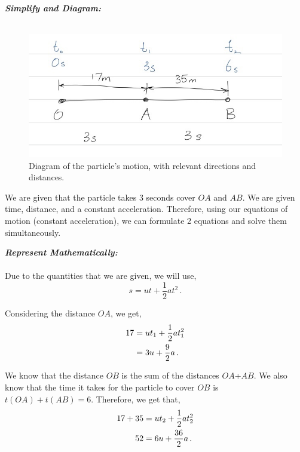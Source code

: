 \begin{subquestions}
\begin{subsubquestions}
\textbf{\textit{Simplify and Diagram:}} \\ \\
\begin{figure}[H]
	\begin{center}
		\includegraphics[scale=0.5]{../2010/figures/2010q5}
		\caption{\label{2010:q5:Move2} Diagram of the particle's motion, with relevant directions and distances.}
	\end{center}
\end{figure}
We are given that the particle takes 3 seconds cover $OA$ and $AB$. We are given time, distance, and a constant acceleration. Therefore, using our equations of motion (constant acceleration), we can formulate 2 equations and solve them simultaneously.




\textbf{\textit{Represent Mathematically:}} \\ \\
Due to the quantities that we are given, we will use,
\begin{equation}
	s = ut + \frac{1}{2}at^2 \,.
\end{equation}

Considering the distance $OA$, we get,
\begin{align}
	17 & = ut_1 + \frac{1}{2}at_1^2 \nonumber \\
	   & = 3u + \frac{9}{2}a \,. \label{2010:q5:MoveEqn1}
\end{align}
	
We know that the distance $OB$ is the sum of the distances $OA$+$AB$. We also know that the time it takes for the particle to cover $OB$ is $t(OA)+t(AB)=6$. Therefore, we get that,
\begin{align}
	17+35 & = ut_2 + \frac{1}{2}at_2^2 \nonumber \\
	   52 & = 6u + \frac{36}{2}a \,. \label{2010:q5:MoveEqn2}
\end{align}





\end{subsubquestions}
\end{subquestions}
